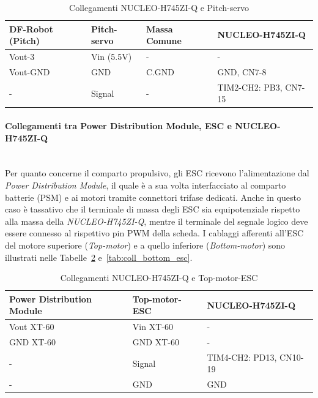 \documentclass[11pt]{report}
\begin{document}
	\begin{table}[H]
		\centering
		\begin{tabular}{l l l l}
			\toprule
			\textbf{DF-Robot (Pitch)} & \textbf{Pitch-servo} & \textbf{Massa Comune} & \textbf{NUCLEO-H745ZI-Q} \\
			\midrule
			Vout-3   & Vin (5.5V) & -    & - \\
			Vout-GND & GND        & C.GND & GND, CN7-8 \\
			-        & Signal     & -    & TIM2-CH2: PB3, CN7-15 \\
			\bottomrule
		\end{tabular}
		\caption{Collegamenti NUCLEO-H745ZI-Q e Pitch-servo}
		\label{tab:coll_pitch_servo}
	\end{table}
	
	\paragraph{Collegamenti tra Power Distribution Module, ESC e NUCLEO-H745ZI-Q}\mbox{}\\
	Per quanto concerne il comparto propulsivo, gli ESC ricevono l'alimentazione dal \textit{Power Distribution Module}, il quale è a sua volta interfacciato al comparto batterie (PSM) e ai motori tramite connettori trifase dedicati. Anche in questo caso è tassativo che il terminale di massa degli ESC sia equipotenziale rispetto alla massa della \textit{NUCLEO-H745ZI-Q}, mentre il terminale del segnale logico deve essere connesso al rispettivo pin PWM della scheda. I cablaggi afferenti all'ESC del motore superiore (\textit{Top-motor}) e a quello inferiore (\textit{Bottom-motor}) sono illustrati nelle Tabelle~\ref{tab:coll_top_esc} e~\ref{tab:coll_bottom_esc}.
	
	\begin{table}[H]
		\centering
		\begin{tabular}{l l l}
			\toprule
			\textbf{Power Distribution Module} & \textbf{Top-motor-ESC} & \textbf{NUCLEO-H745ZI-Q} \\
			\midrule
			Vout XT-60 & Vin XT-60 & - \\
			GND XT-60  & GND XT-60 & - \\
			-          & Signal    & TIM4-CH2: PD13, CN10-19 \\
			-          & GND       & GND \\
			\bottomrule
		\end{tabular}
		\caption{Collegamenti NUCLEO-H745ZI-Q e Top-motor-ESC}
		\label{tab:coll_top_esc}
	\end{table}
	
\end{document}
